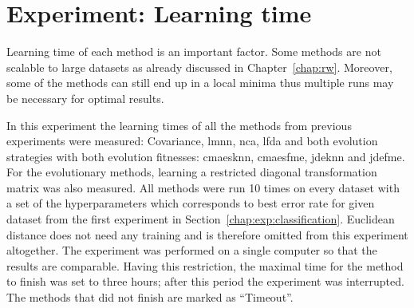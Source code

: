 \documentclass[12pt,a4paper]{report}
\begin{document}

\section{Experiment: Learning time} \label{chap:exp:learning-times}

Learning time of each method is an important factor. Some methods are not scalable to large datasets as already discussed in Chapter~\ref{chap:rw}. Moreover, some of the methods can still end up in a local minima thus multiple runs may be necessary for optimal results.

In this experiment the learning times of all the methods from previous experiments were measured: Covariance, \ac{lmnn}, \ac{nca}, \ac{lfda} and both evolution strategies with both evolution fitnesses: \ac{cmaesknn}, \ac{cmaesfme}, \ac{jdeknn} and \ac{jdefme}. For the evolutionary methods, learning a restricted diagonal transformation matrix was also measured. All methods were run 10 times on every dataset with a set of the hyperparameters which corresponds to best error rate for given dataset from the first experiment in Section~\ref{chap:exp:classification}. Euclidean distance does not need any training and is therefore omitted from this experiment altogether. The experiment was performed on a single computer so that the results are comparable. Having this restriction, the maximal time for the method to finish was set to three hours; after this period the experiment was interrupted. The methods that did not finish are marked as ``Timeout''.
\end{document}
